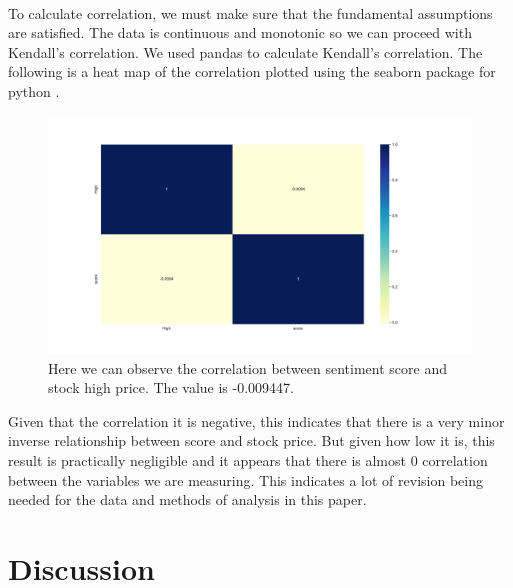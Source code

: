 \documentclass[12pt, letterpaper, titlepage]{article}
\begin{document}
\paragraph{}
To calculate correlation, we must make sure that the fundamental assumptions are satisfied. The data is continuous and monotonic so we can proceed with Kendall's correlation. We used pandas to calculate Kendall's correlation. The following is a heat map of the correlation plotted using the seaborn package for python \citep{Waskom2021}.

\begin{figure}[H]
  \begin{center}
  \includegraphics[width=\textwidth]{../figures/fig2.pdf}
  \caption{Here we can observe the correlation between sentiment score and stock high price. The value is -0.009447. }\label{fig:fig2}
  \end{center}
\end{figure}

Given that the correlation it is negative, this indicates that there is a very minor inverse relationship between score and stock price. But given how low it is, this result is practically negligible and it appears that there is almost 0 correlation between the variables we are measuring. This indicates a lot of revision being needed for the data and methods of analysis in this paper.
\label{sec: discussion}
\section{Discussion}
\end{document}

